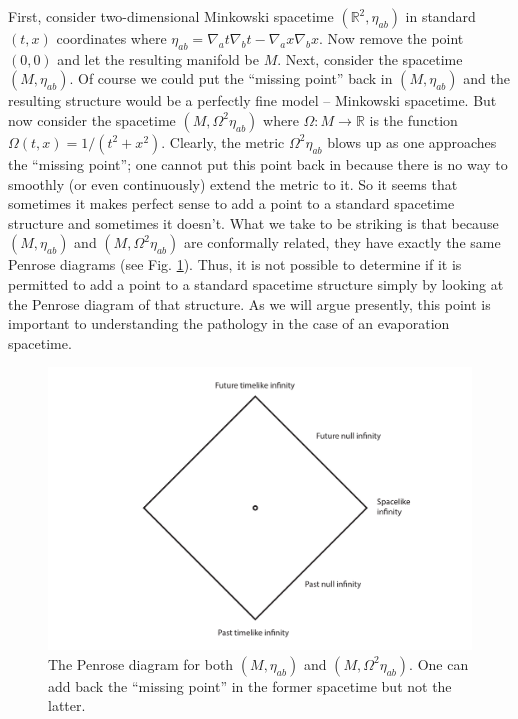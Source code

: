 \documentclass[authoryear,12pt,3p]{jowarticle}
\begin{document}
First, consider two-dimensional Minkowski spacetime $(\mathbb{R}^2, \eta_{ab})$ in standard $(t,x)$ coordinates where $\eta_{ab}=\nabla_at\nabla_bt-\nabla_ax\nabla_bx$. Now remove the point $(0,0)$ and let the resulting manifold be $M$. Next, consider the spacetime $(M,\eta_{ab})$. Of course we could put the ``missing point'' back in $(M,\eta_{ab})$ and the resulting structure would be a perfectly fine model -- Minkowski spacetime. But now consider the spacetime $(M,\Omega^2\eta_{ab})$ where $\Omega: M \rightarrow \mathbb{R}$ is the function $\Omega(t,x)=1/(t^2+x^2)$. Clearly, the metric $\Omega^2\eta_{ab}$ blows up as one approaches the ``missing point''; one cannot put this point back in because there is no way to smoothly (or even continuously) extend the metric to it. So it seems that sometimes it makes perfect sense to add a point to a standard spacetime structure and sometimes it doesn't. What we take to be striking is that because $(M,\eta_{ab})$ and $(M,\Omega^2\eta_{ab})$ are conformally related, they have exactly the same Penrose diagrams (see Fig. \ref{ConMink}). Thus, it is not possible to determine if it is permitted to add a point to a standard spacetime structure simply by looking at the Penrose diagram of that structure. As we will argue presently, this point is important to understanding the pathology in the case of an evaporation spacetime.

\begin{figure}[h]    \centering
   \includegraphics[width=6in]{ManchakBH1.pdf}
   \caption{\label{ConMink} The Penrose diagram for both $(M,\eta_{ab})$ and $(M,\Omega^2\eta_{ab})$. One can add back the ``missing point'' in the former spacetime but not the latter.}
\end{figure}
\end{document}

